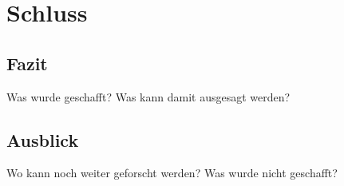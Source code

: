 \chapter{Schluss}

\section{Fazit}
Was wurde geschafft?
Was kann damit ausgesagt werden?

\section{Ausblick}
Wo kann noch weiter geforscht werden?
Was wurde nicht geschafft?